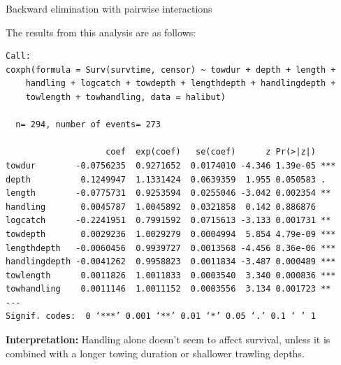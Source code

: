 \documentclass[envcountsect, 10pt, portrait, palatino]{beamer}
\begin{document}
\begin{frame}[fragile]{Backward elimination with pairwise interactions}

The results from this analysis are as follows:
\scriptsize
\begin{verbatim}
Call:
coxph(formula = Surv(survtime, censor) ~ towdur + depth + length +
    handling + logcatch + towdepth + lengthdepth + handlingdepth +
    towlength + towhandling, data = halibut)

  n= 294, number of events= 273

                    coef  exp(coef)   se(coef)      z Pr(>|z|)
towdur        -0.0756235  0.9271652  0.0174010 -4.346 1.39e-05 ***
depth          0.1249947  1.1331424  0.0639359  1.955 0.050583 .
length        -0.0775731  0.9253594  0.0255046 -3.042 0.002354 **
handling       0.0045787  1.0045892  0.0321858  0.142 0.886876
logcatch      -0.2241951  0.7991592  0.0715613 -3.133 0.001731 **
towdepth       0.0029236  1.0029279  0.0004994  5.854 4.79e-09 ***
lengthdepth   -0.0060456  0.9939727  0.0013568 -4.456 8.36e-06 ***
handlingdepth -0.0041262  0.9958823  0.0011834 -3.487 0.000489 ***
towlength      0.0011826  1.0011833  0.0003540  3.340 0.000836 ***
towhandling    0.0011146  1.0011152  0.0003556  3.134 0.001723 **
---
Signif. codes:  0 ‘***’ 0.001 ‘**’ 0.01 ‘*’ 0.05 ‘.’ 0.1 ‘ ’ 1

\end{verbatim}

\normalsize
{\bf Interpretation:}
Handling alone doesn't seem to affect survival, unless it is combined
with a longer towing duration or shallower trawling depths.
\end{frame}
\end{document}
